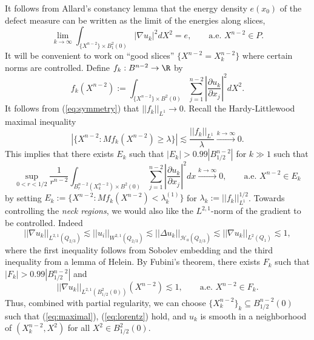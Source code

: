 \documentclass[reqno]{amsart}
\theoremstyle{definition}
\theoremstyle{remark}
\begin{document}
It follows from Allard's constancy lemma that the energy density $e(x_0)$ of the defect measure can be written as the limit of the energies along slices,
	\begin{equation}
		 \lim_{k \to \infty} \int_{\{X^{n - 2} \} \times B^2_1 (0)} |\nabla u_k|^2 dX^2 = e, \qquad \text{a.e. $X^{n - 2} \in P$.} \label{eq:slice}
	\end{equation} 
It will be convenient to work on ``good slices'' $\{ X^{n - 2} = X^{n - 2}_k \}$ where certain norms are controlled. Define $f_k : B^{n - 2} \to \R$ by 
	\[ f_k (X^{n - 2}) := \int_{\{X^{n - 2}\} \times B^2 (0)} \sum_{j = 1}^{n - 2} \left| \frac{\partial u_k}{\partial x_j}  \right|^2 dX^2.  \]
It follows from (\ref{eq:symmetry}) that $||f_k||_{L^1} \to 0$. Recall the Hardy-Littlewood maximal inequality 
	\[ | \{ X^{n - 2}: Mf_k (X^{n - 2}) \geq \lambda  \}| \lesssim \frac{|| f_k||_{L^1}}{\lambda} \overset{k \to \infty}{\longrightarrow} 0. \]	
This implies that there exists $E_k$ such that $|E_k| > 0.99 |B^{n - 2}_{1/2}|$ for $k \gg 1$ such that
	\begin{equation}
		 \sup_{0 < r < 1/2} \frac{1}{r^{n - 2}} \int_{B^{n - 2}_r (X^{n - 2}_k) \times B^2 (0)} \sum_{j = 1}^{n - 2} \left| \frac{\partial u_k}{\partial x_j}  \right|^2 dx \overset{k \to \infty}{\longrightarrow}0, \qquad \text{a.e. $X^{n - 2} \in E_k$} \label{eq:maximal}
	\end{equation}	 	
by setting $E_k := \{ X^{n - 2} : Mf_k (X^{n - 2}) < \lambda_k^{(1)} \}$ for $\lambda_k := ||f_k||_{L^1}^{1/2}$. Towards controlling the \textit{neck regions}, we would also like the $L^{2, 1}$-norm of the gradient to be controlled. Indeed
	\[ || \nabla u_k||_{L^{2, 1} (Q_{2/3})} \lesssim ||u_i||_{W^{2, 1} (Q_{2/3})} \lesssim || \Delta u_k ||_{\mathcal H_a  (Q_{2/3})} \lesssim || \nabla u_k ||_{L^2 (Q_{1})} \lesssim 1,\]
where the first inequality follows from Sobolev embedding and the third inequality from a lemma of Helein. By Fubini's theorem, there exists $F_k$ such that $|F_k| > 0.99 |B^{n - 2}_{1/2}|$ and
	\begin{equation}
		||\nabla u_k||_{L^{2, 1} (B^2_{1/2} (0))}(X^{n - 2}) \lesssim 1, \qquad \text{a.e. $X^{n - 2} \in F_k$}.\label{eq:lorentz}
	\end{equation}
Thus, combined with partial regularity, we can choose $\{X^{n - 2}_k	\}_k \subseteq B^{n - 2}_{1/2} (0)$ such that (\ref{eq:maximal}), (\ref{eq:lorentz}) hold, and $u_k$ is smooth in a neighborhood of $(X^{n - 2}_k, X^2)$ for all $X^2 \in B^2_{1/2} (0)$. 
	
\end{document}
